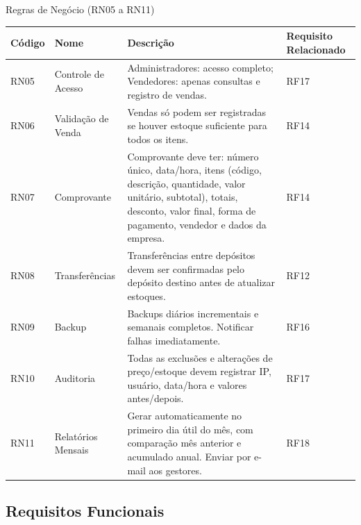 \documentclass[
	12pt,				%
	openany,			%
	twoside,			%
	a4paper,			%
	english,			%
	brazil				%
	]{abntex2}
\begin{document}
\FloatBarrier


\begin{quadro}[htb]
\caption{\label{quadro_rn2}Regras de Negócio (RN05 a RN11)}
\begin{tabular}{|p{1.2cm}|p{4.0cm}|p{7.5cm}|p{2.0cm}|}
    \hline
    \textbf{Código} & \textbf{Nome} & \textbf{Descrição} & \textbf{Requisito Relacionado} \\ \hline

 

    RN05 & Controle de Acesso & Administradores: acesso completo; Vendedores: apenas consultas e registro de vendas. & RF17 \\ \hline

    RN06 & Validação de Venda & Vendas só podem ser registradas se houver estoque suficiente para todos os itens. & RF14 \\ \hline

    RN07 & Comprovante & Comprovante deve ter: número único, data/hora, itens (código, descrição, quantidade, valor unitário, subtotal), totais, desconto, valor final, forma de pagamento, vendedor e dados da empresa. & RF14 \\ \hline

    RN08 & Transferências & Transferências entre depósitos devem ser confirmadas pelo depósito destino antes de atualizar estoques. & RF12 \\ \hline

    RN09 & Backup & Backups diários incrementais e semanais completos. Notificar falhas imediatamente. & RF16 \\ \hline

    RN10 & Auditoria & Todas as exclusões e alterações de preço/estoque devem registrar IP, usuário, data/hora e valores antes/depois. & RF17 \\ \hline

    RN11 & Relatórios Mensais & Gerar automaticamente no primeiro dia útil do mês, com comparação mês anterior e acumulado anual. Enviar por e-mail aos gestores. & RF18 \\ \hline

\end{tabular}
\end{quadro}

\FloatBarrier




\subsection{Requisitos Funcionais}
\end{document}
